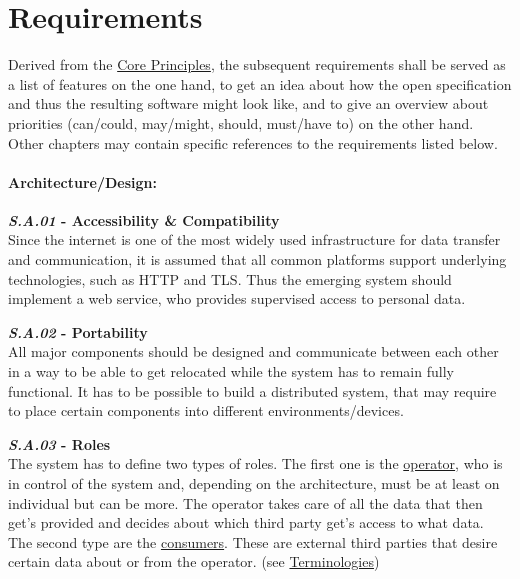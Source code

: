 \documentclass[12pt,english,a4paper,titlepage,cleardoublepage=empty,dottedtoc]{report}
\begin{document}
\chapter{Requirements}\label{requirements}

Derived from the \protect\hyperlink{core-principles}{Core Principles},
the subsequent requirements shall be served as a list of features on the
one hand, to get an idea about how the open specification and thus the
resulting software might look like, and to give an overview about
priorities (can/could, may/might, should, must/have to) on the other
hand. Other chapters may contain specific references to the requirements
listed below.

\subsubsection{Architecture/Design:}\label{architecturedesign}

\textbf{\emph{\protect\hypertarget{sa01}{}{S.A.01}} - Accessibility \&
Compatibility}\\
Since the internet is one of the most widely used infrastructure for
data transfer and communication, it is assumed that all common platforms
support underlying technologies, such as HTTP and TLS. Thus the emerging
system should implement a web service, who provides supervised access to
personal data.

\textbf{\emph{\protect\hypertarget{sa02}{}{S.A.02}} - Portability}\\
All major components should be designed and communicate between each
other in a way to be able to get relocated while the system has to
remain fully functional. It has to be possible to build a distributed
system, that may require to place certain components into different
environments/devices.

\textbf{\emph{\protect\hypertarget{sa03}{}{S.A.03}} - Roles}\\
The system has to define two types of roles. The first one is the
\protect\hyperlink{terminologies--operator}{operator}, who is in control
of the system and, depending on the architecture, must be at least on
individual but can be more. The operator takes care of all the data that
then get's provided and decides about which third party get's access to
what data. The second type are the
\protect\hyperlink{terminologies--consumer}{consumers}. These are
external third parties that desire certain data about or from the
operator. (see \protect\hyperlink{terminologies}{Terminologies})
\end{document}
